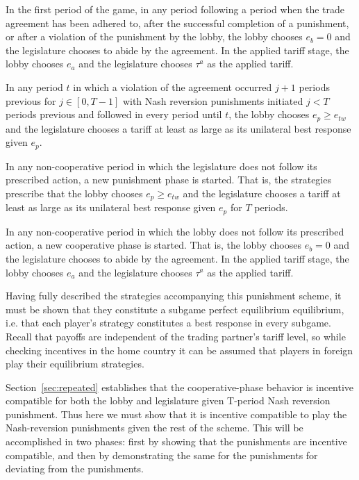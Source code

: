 \documentclass[authoryear, review]{elsarticle}
\begin{document}
In the first period of the game, in any period following a period when the trade agreement has been adhered to, after the successful completion of a punishment, or after a violation of the punishment by the lobby, the lobby chooses $e_b =0$ and the legislature chooses to abide by the agreement. In the applied tariff stage, the lobby chooses $e_a$ and the legislature chooses $\tau^a$ as the applied tariff.

In any period $t$ in which a violation of the agreement occurred $j+1$ periods previous for $j \in [0,T-1]$ with Nash reversion punishments initiated $j<T$ periods previous and followed in every period until $t$, the lobby chooses $e_p \geq e_{tw}$ and the legislature chooses a tariff at least as large as its unilateral best response given $e_p$.

In any non-cooperative period in which the legislature does not follow its prescribed action, a new punishment phase is started. That is, the strategies prescribe that the lobby chooses $e_p \geq e_{tw}$ and the legislature chooses a tariff at least as large as its unilateral best response given $e_p$ for $T$ periods.

In any non-cooperative period in which the lobby does not follow its prescribed action, a new cooperative phase is started. That is, the lobby chooses $e_b =0$ and the legislature chooses to abide by the agreement. In the applied tariff stage, the lobby chooses $e_a$ and the legislature chooses $\tau^a$ as the applied tariff.
		
Having fully described the strategies accompanying this punishment scheme, it must be shown that they constitute a subgame perfect equilibrium equilibrium, i.e. that each player's strategy constitutes a best response in every subgame. Recall that payoffs are independent of the trading partner's tariff level, so while checking incentives in the home country it can be assumed that players in foreign play their equilibrium strategies.
		
Section~\ref{sec:repeated} establishes that the cooperative-phase behavior is incentive compatible for both the lobby and legislature given T-period Nash reversion punishment. Thus here we must show that it is incentive compatible to play the Nash-reversion punishments given the rest of the scheme. This will be accomplished in two phases: first by showing that the punishments are incentive compatible, and then by demonstrating the same for the punishments for deviating from the punishments.
\end{document}
